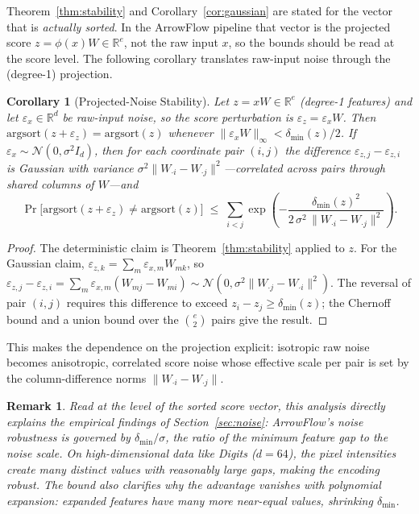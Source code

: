 \documentclass[12pt]{article}
\newcommand{\R}{\mathbb{R}}
\newcommand{\argsort}{\mathrm{argsort}}
\newtheorem{corollary}[theorem]{Corollary}
\newtheorem{remark}{Remark}
\begin{document}
Theorem~\ref{thm:stability} and Corollary~\ref{cor:gaussian} are stated for the vector that is \emph{actually sorted}. In the ArrowFlow pipeline that vector is the projected score $z = \phi(x)W \in \R^e$, not the raw input $x$, so the bounds should be read at the score level. The following corollary translates raw-input noise through the (degree-1) projection.

\begin{corollary}[Projected-Noise Stability]
\label{cor:proj-noise}
Let $z = xW \in \R^e$ (degree-1 features) and let $\varepsilon_x \in \R^d$ be raw-input noise, so the score perturbation is $\varepsilon_z = \varepsilon_x W$. Then $\argsort(z + \varepsilon_z) = \argsort(z)$ whenever $\|\varepsilon_x W\|_\infty < \delta_{\min}(z)/2$. If $\varepsilon_x \sim \mathcal{N}(0, \sigma^2 I_d)$, then for each coordinate pair $(i,j)$ the difference $\varepsilon_{z,j} - \varepsilon_{z,i}$ is Gaussian with variance $\sigma^2\|W_{\cdot i} - W_{\cdot j}\|^2$---\emph{correlated} across pairs through shared columns of $W$---and
\[
\Pr\big[\argsort(z + \varepsilon_z) \neq \argsort(z)\big] \;\leq\; \sum_{i<j} \exp\!\left(-\frac{\delta_{\min}(z)^2}{2\,\sigma^2\,\|W_{\cdot i} - W_{\cdot j}\|^2}\right).
\]
\end{corollary}

\begin{proof}
The deterministic claim is Theorem~\ref{thm:stability} applied to $z$. For the Gaussian claim, $\varepsilon_{z,k} = \sum_m \varepsilon_{x,m} W_{mk}$, so $\varepsilon_{z,j} - \varepsilon_{z,i} = \sum_m \varepsilon_{x,m}(W_{mj} - W_{mi}) \sim \mathcal{N}(0, \sigma^2\|W_{\cdot j} - W_{\cdot i}\|^2)$. The reversal of pair $(i,j)$ requires this difference to exceed $z_i - z_j \geq \delta_{\min}(z)$; the Chernoff bound and a union bound over the $\binom{e}{2}$ pairs give the result.
\end{proof}

This makes the dependence on the projection explicit: isotropic raw noise becomes anisotropic, correlated score noise whose effective scale per pair is set by the column-difference norms $\|W_{\cdot i} - W_{\cdot j}\|$.

\begin{remark}
Read at the level of the sorted score vector, this analysis directly explains the empirical findings of Section~\ref{sec:noise}: ArrowFlow's noise robustness is governed by $\delta_{\min}/\sigma$, the ratio of the minimum feature gap to the noise scale. On high-dimensional data like Digits ($d = 64$), the pixel intensities create many distinct values with reasonably large gaps, making the encoding robust. The bound also clarifies why the advantage vanishes with polynomial expansion: expanded features have many more near-equal values, shrinking $\delta_{\min}$.
\end{remark}
\end{document}
